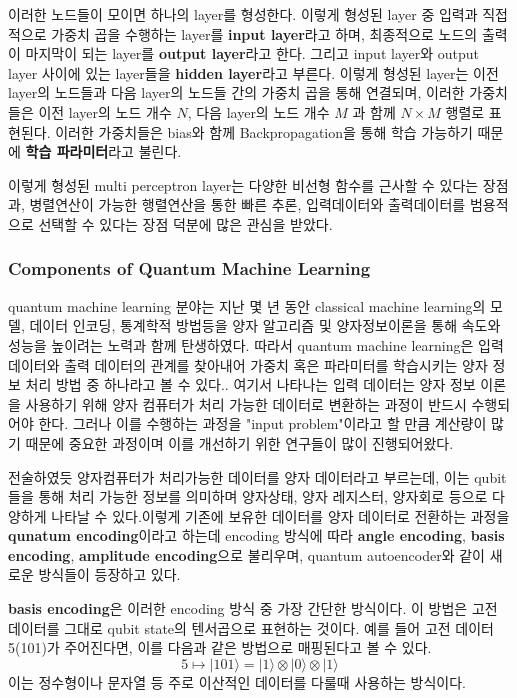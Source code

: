 이러한 노드들이 모이면 하나의 layer를 형성한다. 이렇게 형성된 layer 중 입력과 직접적으로 가중치 곱을 수행하는 layer를 \textbf{input layer}라고 하며, 최종적으로 노드의 출력이 마지막이 되는 layer를 \textbf{output layer}라고 한다. 그리고 input layer와 output layer 사이에 있는 layer들을 \textbf{hidden layer}라고 부른다.\cite{popescu2009multilayer} 이렇게 형성된 layer는 이전 layer의 노드들과 다음 layer의 노드들 간의 가중치 곱을 통해 연결되며, 이러한 가중치들은 이전 layer의 노드 개수 $N$, 다음 layer의 노드 개수 $M$ 과 함께 $N \times M $ 행렬로 표현된다. 이러한 가중치들은 bias와 함께 Backpropagation을 통해 학습 가능하기 때문에 \textbf{학습 파라미터}라고 불린다.

이렇게 형성된 multi perceptron layer는 다양한 비선형 함수를 근사할 수 있다는 장점과, 병렬연산이 가능한 행렬연산을 통한 빠른 추론, 입력데이터와 출력데이터를 범용적으로 선택할 수 있다는 장점 덕분에 많은 관심을 받았다.

\subsubsection{Components of Quantum Machine Learning}
quantum machine learning 분야는 지난 몇 년 동안 classical machine learning의 모델, 데이터 인코딩, 통계학적 방법등을 양자 알고리즘 및 양자정보이론을 통해 속도와 성능을 높이려는 노력과 함께 탄생하였다. 따라서 quantum machine learning은 입력 데이터와 출력 데이터의 관계를 찾아내어 가중치 혹은 파라미터를 학습시키는 양자 정보 처리 방법 중 하나라고 볼 수 있다.\cite{schuld2015introduction}. 여기서 나타나는 입력 데이터는 양자 정보 이론을 사용하기 위해 양자 컴퓨터가 처리 가능한 데이터로 변환하는 과정이 반드시 수행되어야 한다. 그러나 이를 수행하는 과정을 "input problem"이라고 할 만큼 계산량이 많기 때문에 중요한 과정이며 이를 개선하기 위한 연구들이 많이 진행되어왔다.\cite{biamonte2017quantum}

전술하였듯 양자컴퓨터가 처리가능한 데이터를 양자 데이터라고 부르는데, 이는 qubit들을 통해 처리 가능한 정보를 의미하며 양자상태, 양자 레지스터, 양자회로 등으로 다양하게 나타날 수 있다.이렇게 기존에 보유한 데이터를 양자 데이터로 전환하는 과정을 \textbf{qunatum encoding}이라고 하는데 encoding 방식에 따라 \textbf{angle encoding}, \textbf{basis encoding}, \textbf{amplitude encoding}으로 불리우며, quantum autoencoder와 같이 새로운 방식들이 등장하고 있다.\cite{rath2023quantum}

\textbf{basis encoding}은 이러한 encoding 방식 중 가장 간단한 방식이다. 이 방법은 고전 데이터를 그대로 qubit state의 텐서곱으로 표현하는 것이다. 예를 들어 고전 데이터 5(101)가 주어진다면, 이를 다음과 같은 방법으로 매핑된다고 볼 수 있다.
\[
5 \mapsto |101\rangle = |1\rangle \otimes |0\rangle \otimes |1\rangle
\]
이는 정수형이나 문자열 등 주로 이산적인 데이터를 다룰때 사용하는 방식이다.

